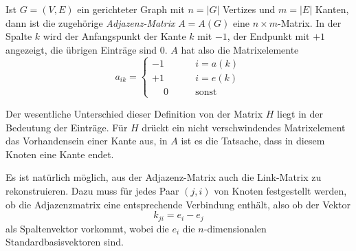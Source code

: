 \begin{definition}
\label{buch:def:adjazenz-matrix}
Ist $G=(V,E)$ ein gerichteter Graph mit $n=|G|$ Vertizes und $m=|E|$ Kanten,
dann ist die zugehörige {\em Adjazenz-Matrix} $A=A(G)$ eine $n\times m$-Matrix.
In der Spalte $k$ wird der Anfangspunkt der Kante $k$ mit $-1$, der Endpunkt
mit $+1$ angezeigt, die übrigen Einträge sind $0$.
$A$ hat also die Matrixelemente
\begin{equation}
a_{ik}
=
\begin{cases}
-1&\qquad i=a(k)\\
+1&\qquad i=e(k)\\
\phantom{+}0&\qquad\text{sonst}
\end{cases}
\label{buch:eqn:ajazenz-matrix}
\end{equation}
\end{definition}

Der wesentliche Unterschied dieser Definition von der Matrix $H$ 
liegt in der Bedeutung der Einträge.
Für $H$ drückt ein nicht verschwindendes Matrixelement das Vorhandensein
einer Kante aus, in $A$ ist es die Tatsache, dass in diesem Knoten
eine Kante endet.

Es ist natürlich möglich, aus der Adjazenz-Matrix auch die Link-Matrix
zu rekonstruieren.
Dazu muss für jedes Paar $(j,i)$ von Knoten festgestellt werden,
ob die Adjazenzmatrix eine entsprechende Verbindung enthält, also ob der
Vektor 
\[
k_{ji} = e_i - e_j
\]
als Spaltenvektor vorkommt, wobei die $e_i$ die $n$-dimensionalen
Standardbasisvektoren sind.


